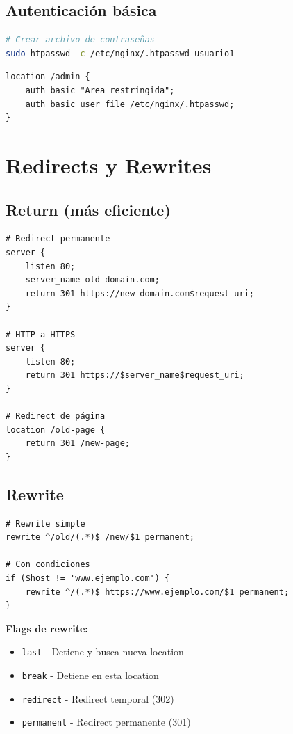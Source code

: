 \documentclass[11pt,a4paper]{article}
\begin{document}
\subsection{Autenticación básica}

\begin{lstlisting}[language=bash]
# Crear archivo de contraseñas
sudo htpasswd -c /etc/nginx/.htpasswd usuario1
\end{lstlisting}

\begin{lstlisting}
location /admin {
    auth_basic "Area restringida";
    auth_basic_user_file /etc/nginx/.htpasswd;
}
\end{lstlisting}

\section{Redirects y Rewrites}

\subsection{Return (más eficiente)}

\begin{lstlisting}
# Redirect permanente
server {
    listen 80;
    server_name old-domain.com;
    return 301 https://new-domain.com$request_uri;
}

# HTTP a HTTPS
server {
    listen 80;
    return 301 https://$server_name$request_uri;
}

# Redirect de página
location /old-page {
    return 301 /new-page;
}
\end{lstlisting}

\subsection{Rewrite}

\begin{lstlisting}
# Rewrite simple
rewrite ^/old/(.*)$ /new/$1 permanent;

# Con condiciones
if ($host != 'www.ejemplo.com') {
    rewrite ^/(.*)$ https://www.ejemplo.com/$1 permanent;
}
\end{lstlisting}

\textbf{Flags de rewrite:}
\begin{itemize}
    \item \texttt{last} - Detiene y busca nueva location
    \item \texttt{break} - Detiene en esta location
    \item \texttt{redirect} - Redirect temporal (302)
    \item \texttt{permanent} - Redirect permanente (301)
\end{itemize}
\end{document}
